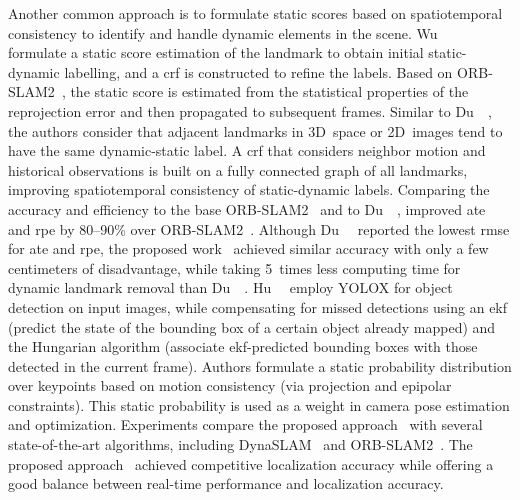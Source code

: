 Another common approach is to formulate static scores based on
spatiotemporal consistency to identify and handle dynamic elements in the scene.
Wu~\etal~\cite{wu:cvci:2022} formulate a static score estimation of
the landmark to obtain initial static-dynamic labelling,
and a \gls{crf} is constructed to refine the labels.
Based on ORB-SLAM2~\cite{mur-artal-tardos:tro:2017},
the static score is estimated from the statistical properties of
the reprojection error and then propagated to subsequent frames.
Similar to Du~\etal~\cite{du:tvcg:2022}, the authors consider that adjacent
landmarks in 3D~space or 2D~images tend to have the same dynamic-static label.
A \gls{crf} that considers neighbor motion and historical observations
is built on a fully connected graph of all landmarks,
improving spatiotemporal consistency of static-dynamic labels.
Comparing the accuracy and efficiency to the base
ORB-SLAM2~\cite{mur-artal-tardos:tro:2017} and to
Du~\etal~\cite{du:tvcg:2022}, improved \gls{ate} and \gls{rpe} by 80--90\%
over ORB-SLAM2~\cite{mur-artal-tardos:tro:2017}.
Although Du~\etal~\cite{du:tvcg:2022} reported the lowest
\gls{rmse} for \gls{ate} and \gls{rpe},
the proposed work~\cite{wu:cvci:2022} achieved similar accuracy
with only a few centimeters of disadvantage,
while taking 5~times less computing time for dynamic landmark removal
than Du~\etal~\cite{du:tvcg:2022}.
Hu~\etal~\cite{hu:tcsvt:2025} employ YOLOX for object detection on input images,
while compensating for missed detections using an \gls{ekf}
(predict the state of the bounding box of a certain object already mapped)
and the Hungarian algorithm (associate \gls{ekf}-predicted bounding boxes
with those detected in the current frame).
Authors formulate a static probability distribution over keypoints
based on motion consistency (via projection and epipolar constraints).
This static probability is used as a weight in
camera pose estimation and optimization.
Experiments compare the proposed approach~\cite{hu:tcsvt:2025} with
several state-of-the-art algorithms, including DynaSLAM~\cite{bescos:ral:2018}
and ORB-SLAM2~\cite{mur-artal-tardos:tro:2017}.
The proposed approach~\cite{hu:tcsvt:2025} achieved
competitive localization accuracy while offering a good balance
between real-time performance and localization accuracy.


